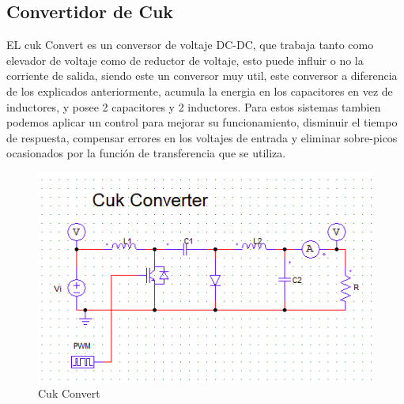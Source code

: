 \documentclass[11pt]{article}
\begin{document}
\subsection{Convertidor de Cuk}
EL cuk Convert es un conversor de voltaje DC-DC, que trabaja tanto como elevador de voltaje como de reductor de voltaje, esto puede influir o no la corriente de salida, siendo este un conversor muy util, este conversor a diferencia de los explicados anteriormente, acumula la energia en los capacitores en vez de inductores, y posee 2 capacitores y 2 inductores. Para estos sistemas tambien podemos aplicar un control para mejorar su funcionamiento, disminuir el tiempo de respuesta, compensar errores en los voltajes de entrada y eliminar sobre-picos ocasionados por la función de transferencia que se utiliza.
\begin{figure}[htp]
\centering
\includegraphics[scale=0.60]{Cuk convert.png}
\caption{Cuk Convert}
\label{}
\end{figure}
\pagebreak


\nocite{*}


{}

\end{document}
